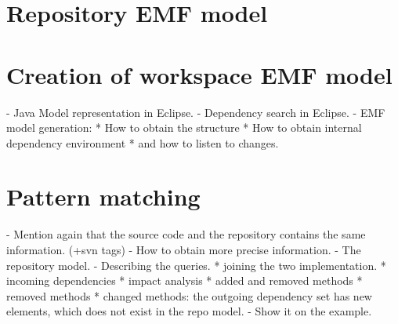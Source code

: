 \section{Repository EMF model}

\section{Creation of workspace EMF model}
- Java Model representation in Eclipse. 
- Dependency search in Eclipse.
- EMF model generation:
 * How to obtain the structure 
 * How to obtain internal dependency environment
 * and how to listen to changes.

\section{Pattern matching}
- Mention again that the source code and the repository contains the same information. (+svn tags)
- How to obtain more precise information.
- The repository model. 
- Describing the queries.
* joining the two implementation. 
* incoming dependencies
* impact analysis
  * added and removed methods
  * removed methods
  * changed methods: the outgoing dependency set has new elements, which does not exist in the repo model. 
-  Show it on the example.
